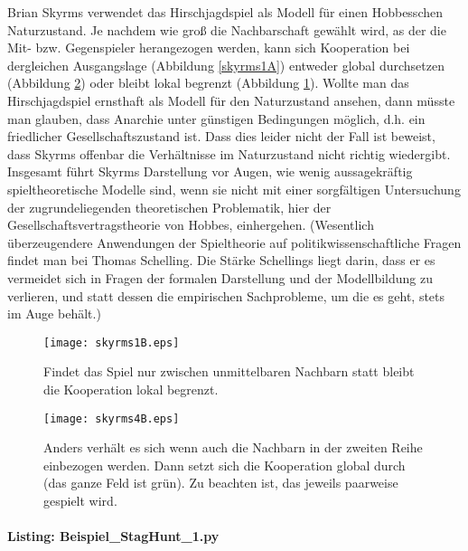 \documentclass[12pt,a4paper,ngerman]{article}
\begin{document}
Brian Skyrms verwendet das Hirschjagdspiel als Modell für einen
Hobbesschen Naturzustand. Je nachdem wie groß die Nachbarschaft
gewählt wird, as der die Mit- bzw. Gegenspieler herangezogen werden,
kann sich Kooperation bei dergleichen Ausgangslage (Abbildung
\ref{skyrms1A}) entweder global durchsetzen (Abbildung \ref{skyrms4B})
oder bleibt lokal begrenzt (Abbildung \ref{skyrms1B}).  Wollte man das
Hirschjagdspiel ernsthaft als Modell für den Naturzustand ansehen,
dann müsste man glauben, dass Anarchie unter günstigen Bedingungen
möglich, d.h. ein friedlicher Gesellschaftszustand ist. Dass dies
leider nicht der Fall ist beweist, dass Skyrms offenbar die
Verhältnisse im Naturzustand nicht richtig wiedergibt. Insgesamt führt
Skyrms Darstellung \cite{skyrms:2004} vor Augen, wie wenig
aussagekräftig spieltheoretische Modelle sind, wenn sie nicht mit
einer sorgfältigen Untersuchung der zugrundeliegenden theoretischen
Problematik, hier der Gesellschaftsvertragstheorie von Hobbes,
einhergehen. (Wesentlich überzeugendere Anwendungen der Spieltheorie
auf politikwissenschaftliche Fragen findet man bei Thomas Schelling.
Die Stärke Schellings liegt darin, dass er es vermeidet sich in Fragen
der formalen Darstellung und der Modellbildung zu verlieren, und statt
dessen die empirischen Sachprobleme, um die es geht, stets im Auge
behält.)

\begin{figure}
\begin{center}
\texttt{[image: skyrms1B.eps]}
\caption{\label{skyrms1B} Findet das Spiel nur zwischen unmittelbaren
  Nachbarn statt bleibt die Kooperation lokal begrenzt.}
\end{center}
\end{figure}
\begin{figure}
\begin{center}
\texttt{[image: skyrms4B.eps]}
\caption{\label{skyrms4B} Anders verhält es sich wenn auch die
  Nachbarn in der zweiten Reihe einbezogen werden. Dann setzt sich die
  Kooperation global durch (das ganze Feld ist grün). Zu beachten ist,
  das jeweils paarweise gespielt wird.}
\end{center}
\end{figure}
\newpage

\paragraph{Listing: Beispiel\_StagHunt\_1.py}
\end{document}
